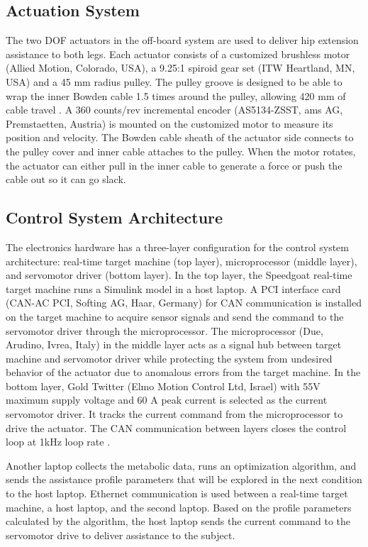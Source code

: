 \subsection{Actuation System}
The two DOF actuators in the off-board system are used to deliver hip extension assistance to both legs. Each actuator consists of a customized brushless motor (Allied Motion, Colorado, USA), a 9.25:1 spiroid gear set (ITW Heartland, MN, USA) and a 45 mm radius pulley. The pulley groove is designed to be able to wrap the inner Bowden cable 1.5 times around the pulley, allowing 420 mm of cable travel \citep{Lee2018}. A 360 counts/rev incremental encoder (AS5134-ZSST, ams AG, Premstaetten, Austria) is mounted on the customized motor to measure its position and velocity. The Bowden cable sheath of the actuator side connects to the pulley cover and inner cable attaches to the pulley. When the motor rotates, the actuator can either pull in the inner cable to generate a force or push the cable out so it can go slack.

\subsection{Control System Architecture}
The electronics hardware has a three-layer configuration for the control system architecture: real-time target machine (top layer), microprocessor (middle layer), and servomotor driver (bottom layer). In the top layer, the Speedgoat real-time target machine runs a Simulink model in a host laptop. A PCI interface card (CAN-AC PCI, Softing AG, Haar, Germany) for CAN communication is installed on the target machine to acquire sensor signals and send the command to the servomotor driver through the microprocessor. The microprocessor (Due, Arudino, Ivrea, Italy) in the middle layer acts as a signal hub between target machine and servomotor driver while protecting the system from undesired behavior of the actuator due to anomalous errors from the target machine. In the bottom layer, Gold Twitter (Elmo Motion Control Ltd, Israel) with 55V maximum supply voltage and 60 A peak current is selected as the current servomotor driver. It tracks the current command from the microprocessor to drive the actuator. The CAN communication between layers closes the control loop at 1kHz loop rate \citep{Lee2018}.

Another laptop collects the metabolic data, runs an optimization algorithm, and sends the assistance profile parameters that will be explored in the next condition to the host laptop. Ethernet communication is used between a real-time target machine, a host laptop, and the second laptop. Based on the profile parameters calculated by the algorithm, the host laptop sends the current command to the servomotor drive to deliver assistance to the subject.

